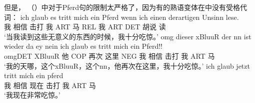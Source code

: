但是， （）中对于Pferd句的限制太严格了，因为有的熟语变体在\vfc 中没有受格代词：
\eal
\pagebreak
\ex 
\gll ich glaub es tritt mich ein Pferd wenn ich einen derartigen Unsinn lese.\footnotemark\\
     我 相信 \expl{} 击打 我 ART 马 REL 我 ART DET 胡说 读\\
\glt `当我读到这些无意义的东西的时候，我十分吃惊。'
\ex 
\gll omg dieser xBluuR der nn ist wieder da ey nein ich glaub es tritt mich ein Pferd!!\footnotemark\\
    omgDET   XBluuR 他  {} COP  再次 这里 {} NEG 我 相信 \expl{} 击打 我 ART 马\\
\glt `我的天哪，这个xBluuR，这个nn，他再次在这里，我十分吃惊。'
\ex 
\gll ich glaub jetzt tritt mich ein pferd\footnotemark\\
    我 相信 现在   击打 我 ART 马\\
\glt `我现在非常吃惊。'
